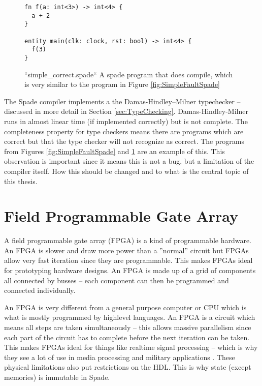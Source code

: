 \begin{figure}[h]
\begin{center}
\begin{verbatim}
fn f(a: int<3>) -> int<4> {
  a + 2
}

entity main(clk: clock, rst: bool) -> int<4> {
  f(3)
}
\end{verbatim}
\end{center}
\label{fig:SimpleCorrectSpade}
\caption{``simple\_correct.spade`` A spade program that does compile, which is very similar to the program in Figure \ref{fig:SimpleFaultSpade}}
\end{figure}

The Spade compiler implements a the Damas-Hindley–Milner typechecker -- discussed in more detail in Section \ref{sec:TypeChecking}. Damas-Hindley-Milner runs in almost linear time (if implemented correctly) but is not complete. The completeness property for type checkers means there are programs which are correct but that the type checker will not recognize as correct. The programs from Figures \ref{fig:SimpleFaultSpade} and \ref{fig:SimpleCorrectSpade} are an example of this. This observation is important since it means this is not a bug, but a limitation of the compiler itself. How this should be changed and to what is the central topic of this thesis.

\section{Field Programmable Gate Array}
A field programmable gate array (FPGA) is a kind of programmable hardware. An FPGA is slower and draw more power than a ''normal'' circuit but FPGAs allow very fast iteration since they are programmable. This makes FPGAs ideal for prototyping hardware designs. An FPGA is made up of a grid of components all connected by busses -- each component can then be programmed and connected individually. \cite{src:FPGA}

An FPGA is very different from a general purpose computer or CPU which is what is mostly programmed by highlevel languages. An FPGA is a circuit which means all steps are taken simultaneously -- this allows massive parallelism since each part of the circuit has to complete before the next iteration can be taken. This makes FPGAs ideal for things like realtime signal processing -- which is why they see a lot of use in media processing and military applications \cite{src:FPGAApplications}. These physical limitations also put restrictions on the HDL. This is why state (except memories) is immutable in Spade.

